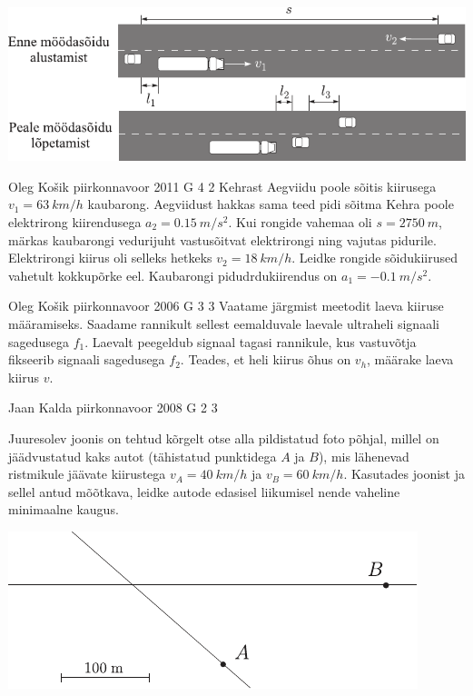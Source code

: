 \documentclass[11pt]{article}
\begin{document}
{{\begin{center}
	\includegraphics[width=\linewidth]{2005-v2g-01-yl}
\end{center}
\fi
}

{Oleg Košik} %
{piirkonnavoor} %
{2011} %
{G 4} %
{2} %
{
\ifStatement
Kehrast Aegviidu poole sõitis kiirusega $v_1=\SI{63}{km/h}$ kaubarong. Aegviidust hakkas sama teed pidi sõitma Kehra poole elektrirong kiirendusega $a_2=\SI{0,15}{m/s^2}$. Kui rongide vahemaa oli $s=\SI{2750}{m}$, märkas kaubarongi vedurijuht vastusõitvat elektrirongi ning vajutas pidurile. Elektrirongi kiirus oli selleks hetkeks $v_2=\SI{18}{km/h}$. Leidke rongide sõidukiirused vahetult kokkupõrke eel. Kaubarongi pidudrdukiirendus on $a_1=-\SI{0,1}{m/s^2}$.
\fi
}

{Oleg Košik} %
{piirkonnavoor} %
{2006} %
{G 3} %
{3} %
{
\ifStatement
Vaatame järgmist meetodit laeva kiiruse määramiseks. Saadame rannikult sellest eemalduvale laevale ultraheli signaali sagedusega $f_1$. Laevalt peegeldub signaal tagasi rannikule, kus vastuvõtja fikseerib signaali sagedusega $f_2$. Teades, et heli kiirus õhus on $v_h$, määrake laeva kiirus $v$.
\fi
}

{Jaan Kalda} %
{piirkonnavoor} %
{2008} %
{G 2} %
{3} %
{
\ifStatement
Juuresolev joonis on tehtud kõrgelt otse alla pildistatud foto põhjal, millel on jäädvustatud kaks autot (tähistatud punktidega $A$ ja $B$), mis lähenevad ristmikule jäävate kiirustega $v_A = \SI{40}{km/h}$ ja $v_B = \SI{60}{km/h}$. Kasutades joonist ja sellel antud mõõtkava, leidke autode edasisel liikumisel nende vaheline minimaalne kaugus.

\begin{center}
	\includegraphics[width=0.9\linewidth]{2008-v2g-02-yl}
\end{center}
\fi
}

}
\end{document}

